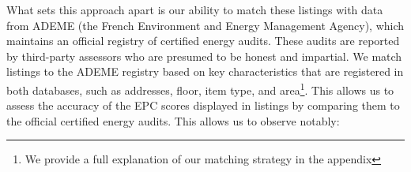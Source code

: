 What sets this approach apart is our ability to match these listings with data from ADEME (the French Environment and Energy Management Agency), which maintains an official registry of certified energy audits. These audits are reported by third-party assessors who are presumed to be honest and impartial. We match listings to the ADEME registry based on key characteristics that are registered in both databases, such as addresses, floor, item type, and area\footnote{We provide a full explanation of our matching strategy in the appendix}. This allows us to assess the accuracy of the EPC scores displayed in listings by comparing them to the official certified energy audits. This allows us to observe notably:
